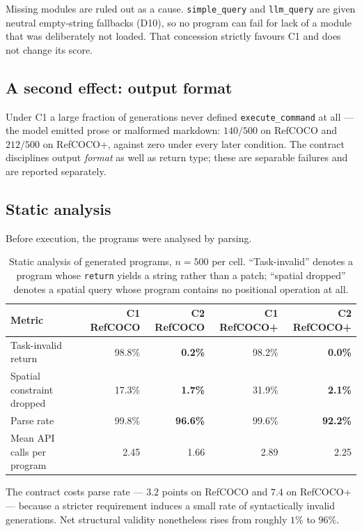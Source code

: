 \documentclass[12pt,a4paper,oneside]{report}
\newcommand{\up}[1]{\textcolor{good}{\textbf{#1}}}
\newcommand{\down}[1]{\textcolor{bad}{\textbf{#1}}}
\begin{document}
Missing modules are ruled out as a cause. \texttt{simple\_query} and
\texttt{llm\_query} are given neutral empty-string fallbacks (D10), so no program can
fail for lack of a module that was deliberately not loaded. That concession strictly
favours C1 and does not change its score.

\subsection{A second effect: output format}

Under C1 a large fraction of generations never defined \texttt{execute\_command} at
all --- the model emitted prose or malformed markdown: $140/500$ on RefCOCO and
$212/500$ on RefCOCO+, against zero under every later condition. The contract
disciplines output \emph{format} as well as return type; these are separable failures
and are reported separately.

\subsection{Static analysis}

Before execution, the programs were analysed by parsing.

\begin{table}[htbp]\centering
\caption{Static analysis of generated programs, $n=500$ per cell. ``Task-invalid''
denotes a program whose \texttt{return} yields a string rather than a patch;
``spatial dropped'' denotes a spatial query whose program contains no positional
operation at all.}
\label{tab:static}
\begin{tabular}{@{}lrrrr@{}}
\toprule
\textbf{Metric} & \textbf{C1 RefCOCO} & \textbf{C2 RefCOCO} & \textbf{C1 RefCOCO+} & \textbf{C2 RefCOCO+} \\
\midrule
Task-invalid return & 98.8\% & \up{0.2\%} & 98.2\% & \up{0.0\%} \\
Spatial constraint dropped & 17.3\% & \up{1.7\%} & 31.9\% & \up{2.1\%} \\
Parse rate & 99.8\% & \down{96.6\%} & 99.6\% & \down{92.2\%} \\
Mean API calls per program & 2.45 & 1.66 & 2.89 & 2.25 \\
\bottomrule
\end{tabular}
\end{table}

The contract costs parse rate --- $3.2$ points on RefCOCO and $7.4$ on RefCOCO+ ---
because a stricter requirement induces a small rate of syntactically invalid
generations. Net structural validity nonetheless rises from roughly $1\%$ to $96\%$.
\end{document}
